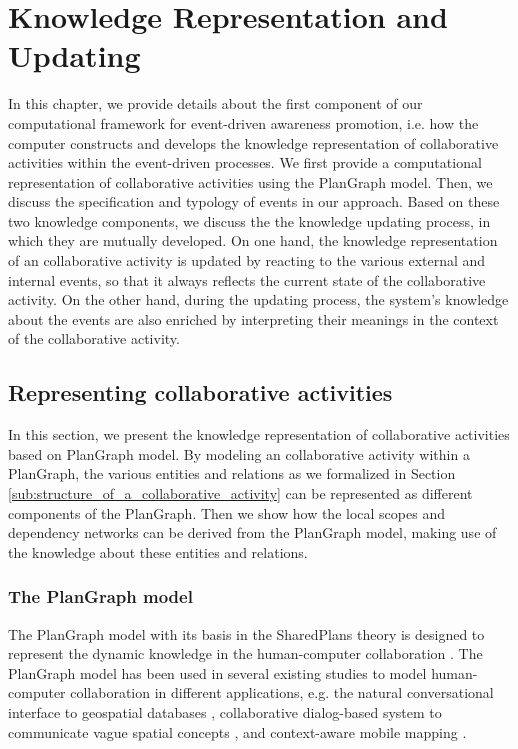 \graphicspath{{Figures/}}

\chapter{Knowledge Representation and Updating} %
\label{cha:knowledge_reprsentation_and_updating}
In this chapter, we provide details about the first component of our computational framework for event-driven awareness promotion, i.e. how the computer constructs and develops the knowledge representation of collaborative activities within the event-driven processes. We first provide a computational representation of collaborative activities using the PlanGraph model. Then, we discuss the specification and typology of events in our approach. Based on these two knowledge components, we discuss the the knowledge updating process, in which they are mutually developed. On one hand, the knowledge representation of an collaborative activity is updated by reacting to the various external and internal events, so that it always reflects the current state of the collaborative activity. On the other hand, during the updating process, the system's knowledge about the events are also enriched by interpreting their meanings in the context of the collaborative activity.

\section{Representing collaborative activities} %
\label{sec:representing_the_field_of_work}
In this section, we present the knowledge representation of collaborative activities based on PlanGraph model. By modeling an collaborative activity within a PlanGraph, the various entities and relations as we formalized in Section \ref{sub:structure_of_a_collaborative_activity} can be represented as different components of the PlanGraph. Then we show how the local scopes and dependency networks can be derived from the PlanGraph model, making use of the knowledge about these entities and relations.

\subsection{The PlanGraph model} %
\label{sub:the_plangraph_model}
The PlanGraph model with its basis in the SharedPlans theory is designed to represent the dynamic knowledge in the human-computer collaboration \cite{Cai2005}. The PlanGraph model has been used in several existing studies to model human-computer collaboration in different applications, e.g. the natural conversational interface to geospatial databases \cite{Cai2005}, collaborative dialog-based system to communicate vague spatial concepts \cite{Cai2003}, and context-aware mobile mapping \cite{yu2010using}. 

